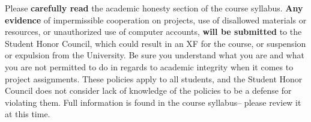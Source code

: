 \documentclass[11pt]{article}
\begin{document}
    Please \textbf{carefully read} the academic honesty section of the course
  syllabus.  \textbf{Any evidence} of impermissible cooperation on projects,
  use of disallowed materials or resources, or unauthorized use of computer
  accounts, \textbf{will be submitted} to the Student Honor Council, which
  could result in an XF for the course, or suspension or expulsion from the
  University.  Be sure you understand what you are and what you are not
  permitted to do in regards to academic integrity when it comes to project
  assignments.  These policies apply to all students, and the Student Honor
  Council does not consider lack of knowledge of the policies to be a
  defense for violating them.  Full information is found in the course
  syllabus-- please review it at this time.
\end{document}
